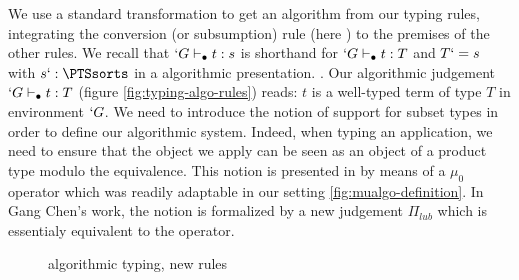 \documentclass{llncs}
\begin{document}
\begin{paragraph}{}
We use a standard transformation to get an algorithm from our typing
rules, integrating the conversion (or subsumption) rule
(here ) to the premises of the other rules.
We recall that $`G \type t : s$ is shorthand for $`G \type t : T$ and
$T  `= s$ with $s `: \PTSsorts$ in a algorithmic presentation.
. Our algorithmic judgement $`G \vdash_{\bullet} t : T$
(figure \vref{fig:typing-algo-rules})
reads: $t$ is a well-typed term of type $T$ in environment $`G$.
We need to introduce the notion of support for subset types in order to
define our algorithmic system. Indeed, when typing an application, 
we need to ensure that the object we apply can be seen as an object of a
product type modulo the equivalence. This notion is presented in \PVS{} by
means of a $\mu_0$ operator which was readily adaptable in our setting
\vref{fig:mualgo-definition}. In Gang Chen's work, the notion is formalized by a
new judgement $\Pi_{lub}$ which is essentialy equivalent to the operator.
\begin{figure*}[t]
  \def\infvspace{0.5em}
    \def\type{\typea}
    \def\subt{\subta}
    \def\sub{\suba}
    \def\fCenter{\typea}
    \begin{center}
    
    
    
    


    \vspace{\infvspace}
    \AppA\DP

    
    \vspace{\infvspace}
    \SumDepA\DP

    \vspace{\infvspace}
    \PiLeftA\DP
    
    \vspace{\infvspace}
    \PiRightA\DP

  \end{center}
  \vspace{-2em}
  \caption{\Russell{} algorithmic typing, new rules}
  \label{fig:typing-algo-rules}
\end{figure*}


\end{paragraph}
\end{document}
